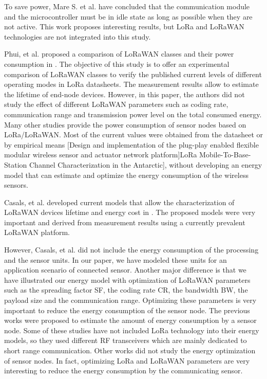 To save power,
	Mare S.
et al.
have concluded that the communication module and the microcontroller must be in idle state as long as possible when they are not active.
This work proposes interesting results,
	but LoRa and LoRaWAN technologies are not integrated into this study.

Phui,
	et al.
proposed a comparison of LoRaWAN classes and their power consumption in \cite{cheong_comparison_2017}.
The objective of this study is to offer an experimental comparison of LoRaWAN classes to verify the published current levels of different operating modes in LoRa datasheets.
The measurement results allow to estimate the lifetime of end-node devices.
However,
	in this paper,
	the authors did not study the effect of different LoRaWAN parameters such as coding rate,
	communication range and transmission power level on the total consumed energy.
Many other studies provide the power consumption of sensor nodes based on LoRa/LoRaWAN.
Most of the current values were obtained from the datasheet or by empirical means \cite{neumann_indoor_2016}[Design and implementation of the plug-play enabled ﬂexible modular wireless sensor and actuator network platform]LoRa Mobile-To-Base-Station Channel Characterization in the Antarctic],
	without developing an energy model that can estimate and optimize the energy consumption of the wireless sensors.

Casals,
	et al.
developed current models that allow the characterization of LoRaWAN devices lifetime and energy cost in \cite{casals_modeling_2017}.
The proposed models were very important and derived from measurement results using a currently prevalent LoRaWAN platform.

However,
	Casals,
	et al.
did not include the energy consumption of the processing and the sensor units.
In our paper,
	we have modeled these units for an application scenario of connected sensor.
Another major difference is that we have illustrated our energy model with optimization of LoRaWAN parameters such as the spreading factor SF,
	the coding rate CR,
	the bandwidth BW,
	the payload size and the communication range.
Optimizing these parameters is very important to reduce the energy consumption of the sensor node.
The previous works were proposed to estimate the amount of energy consumption by a sensor node.
Some of these studies have not included LoRa technology into their energy models,
	so they used different RF transceivers which are mainly dedicated to short range communication.
Other works did not study the energy optimization of sensor nodes.
In fact,
	optimizing LoRa and LoRaWAN parameters are very interesting to reduce the energy consumption by the communicating sensor.

